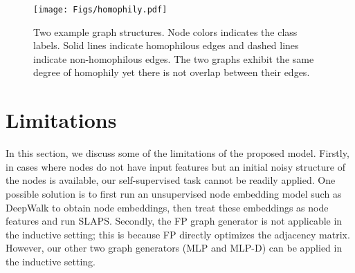 \documentclass{article}
\begin{document}
\begin{figure}[t]
   \texttt{[image: Figs/homophily.pdf]}
   \caption{\label{fig:homophily} Two example graph structures. Node colors indicates the class labels. Solid lines indicate homophilous edges and dashed lines indicate non-homophilous edges. The two graphs exhibit the same degree of homophily yet there is not overlap between their edges.
   }
\end{figure}

\section{Limitations}
In this section, we discuss some of the limitations of the proposed model. Firstly, in cases where nodes do not have input features but an initial noisy structure of the nodes is available, our self-supervised task cannot be readily applied. One possible solution is to first run an unsupervised node embedding model such as DeepWalk \cite{perozzi2014deepwalk} to obtain node embeddings, then treat these embeddings as node features and run SLAPS. 
Secondly, the FP graph generator is not applicable in the inductive setting; this is because FP directly optimizes the adjacency matrix. However, our other two graph generators (MLP and MLP-D) can be applied in the inductive setting.
\end{document}
